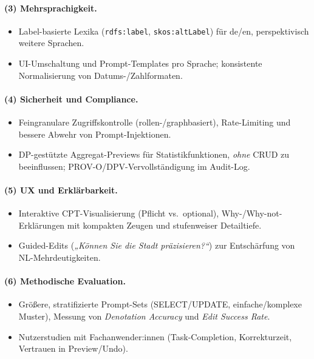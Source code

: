 \paragraph{(3) Mehrsprachigkeit.}
\begin{itemize}
  \item Label-basierte Lexika (\texttt{rdfs:label}, \texttt{skos:altLabel}) für de/en, perspektivisch weitere Sprachen.
  \item UI-Umschaltung und Prompt-Templates pro Sprache; konsistente Normalisierung von Datums-/Zahlformaten.
\end{itemize}

\paragraph{(4) Sicherheit und Compliance.}
\begin{itemize}
  \item Feingranulare Zugriffskontrolle (rollen-/graphbasiert), Rate-Limiting und bessere Abwehr von Prompt-Injektionen.
  \item DP-gestützte Aggregat-Previews für Statistikfunktionen, \emph{ohne} CRUD zu beeinflussen; PROV-O/DPV-Vervollständigung im Audit-Log.
\end{itemize}

\paragraph{(5) UX und Erklärbarkeit.}
\begin{itemize}
  \item Interaktive CPT-Visualisierung (Pflicht vs.\ optional), Why-/Why-not-Erklärungen mit kompakten Zeugen und stufenweiser Detailtiefe.
  \item Guided-Edits (\emph{„Können Sie die Stadt präzisieren?“}) zur Entschärfung von NL-Mehrdeutigkeiten.
\end{itemize}

\paragraph{(6) Methodische Evaluation.}
\begin{itemize}
  \item Größere, stratifizierte Prompt-Sets (SELECT/UPDATE, einfache/komplexe Muster), Messung von \emph{Denotation Accuracy} und \emph{Edit Success Rate}.
  \item Nutzerstudien mit Fachanwender:innen (Task-Completion, Korrekturzeit, Vertrauen in Preview/Undo).
\end{itemize}


